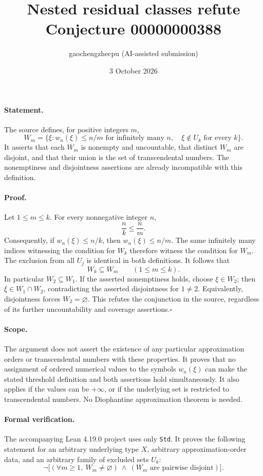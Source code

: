 \documentclass[11pt]{article}
\title{Nested residual classes refute Conjecture 00000000388}
\author{gaochengzhecpu (AI-assisted submission)}
\date{3 October 2026}
\begin{document}
\maketitle

\paragraph{Statement.}
The source defines, for positive integers $m$,
\[
 W_m=\{\xi: w_n(\xi)\le n/m \text{ for infinitely many }n,
                 \quad \xi\notin U_k\text{ for every }k\}.
\]
It asserts that each $W_m$ is nonempty and uncountable, that distinct
$W_m$ are disjoint, and that their union is the set of transcendental numbers.
The nonemptiness and disjointness assertions are already incompatible with this definition.

\paragraph{Proof.}
Let $1\le m\le k$. For every nonnegative integer $n$,
\[
 \frac{n}{k}\le\frac{n}{m}.
\]
Consequently, if $w_n(\xi)\le n/k$, then $w_n(\xi)\le n/m$.
The same infinitely many indices witnessing the condition for $W_k$
therefore witness the condition for $W_m$. The exclusion from all $U_j$
is identical in both definitions. It follows that
\[
 W_k\subseteq W_m \qquad (1\le m\le k).
\]
In particular $W_2\subseteq W_1$. If the asserted nonemptiness holds,
choose $\xi\in W_2$; then $\xi\in W_1\cap W_2$, contradicting the asserted
disjointness for $1\ne2$. Equivalently, disjointness forces $W_2=\varnothing$.
This refutes the conjunction in the source, regardless of its further
uncountability and coverage assertions.\hfill$\square$

\paragraph{Scope.}
The argument does not assert the existence of any particular approximation
orders or transcendental numbers with these properties. It proves that no
assignment of ordered numerical values to the symbols $w_n(\xi)$ can make
the stated threshold definition and both assertions hold simultaneously.
It also applies if the values can be $+\infty$, or if the underlying set
is restricted to transcendental numbers. No Diophantine approximation
theorem is needed.

\newpage
\paragraph{Formal verification.}
The accompanying Lean 4.19.0 project uses only \texttt{Std}.
It proves the following statement for an arbitrary underlying type $X$,
arbitrary approximation-order data, and an arbitrary family of excluded sets $U_k$:
\[
 \neg\bigl[(\forall m\ge1,\ W_m\ne\varnothing)
      \ \wedge\ (W_m\text{ are pairwise disjoint})\bigr].
\]
\end{document}
